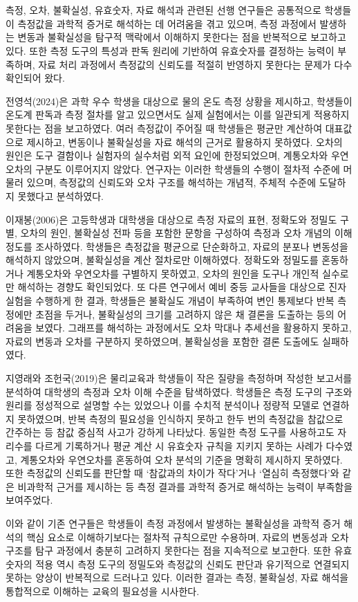 \section{}
\ganadareset

측정, 오차, 불확실성, 유효숫자, 자료 해석과 관련된 선행 연구들은
공통적으로 학생들이 측정값을 과학적 증거로 해석하는 데 어려움을 겪고 있으며,
측정 과정에서 발생하는 변동과 불확실성을
탐구적 맥락에서 이해하지 못한다는 점을 반복적으로 보고하고 있다.
%
또한 측정 도구의 특성과 판독 원리에 기반하여 유효숫자를 결정하는 능력이 부족하며,
자료 처리 과정에서 측정값의 신뢰도를 적절히 반영하지 못한다는 문제가 다수 확인되어 왔다.

전영석(2024)은 과학 우수 학생을 대상으로 물의 온도 측정 상황을 제시하고,
학생들이 온도계 판독과 측정 절차를 알고 있으면서도 실제 실험에서는
이를 일관되게 적용하지 못한다는 점을 보고하였다.
%
여러 측정값이 주어질 때 학생들은 평균만 계산하여 대표값으로 제시하고,
변동이나 불확실성을 자료 해석의 근거로 활용하지 못하였다.
오차의 원인은 도구 결함이나 실험자의 실수처럼 외적 요인에 한정되었으며,
계통오차와 우연오차의 구분도 이루어지지 않았다.
%
연구자는 이러한 학생들의 수행이 절차적 수준에 머물러 있으며,
측정값의 신뢰도와 오차 구조를 해석하는 개념적, 주체적 수준에 도달하지 못했다고 분석하였다.

이재봉(2006)은 고등학생과 대학생을 대상으로 측정 자료의 표현, 정확도와 정밀도 구별,
오차의 원인, 불확실성 전파 등을 포함한 문항을 구성하여 측정과 오차 개념의 이해 정도를 조사하였다.
학생들은 측정값을 평균으로 단순화하고, 자료의 분포나 변동성을 해석하지 않았으며,
불확실성을 계산 절차로만 이해하였다.
정확도와 정밀도를 혼동하거나 계통오차와 우연오차를 구별하지 못하였고,
오차의 원인을 도구나 개인적 실수로만 해석하는 경향도 확인되었다.
%
또 다른 연구에서 예비 중등 교사들을 대상으로 진자 실험을 수행하게 한 결과,
학생들은 불확실도 개념이 부족하여 변인 통제보다 반복 측정에만 초점을 두거나,
불확실성의 크기를 고려하지 않은 채 결론을 도출하는 등의 어려움을 보였다.
그래프를 해석하는 과정에서도 오차 막대나 추세선을 활용하지 못하고,
자료의 변동과 오차를 구분하지 못하였으며, 불확실성을 포함한 결론 도출에도 실패하였다.

지영래와 조헌국(2019)은 물리교육과 학생들이 작은 질량을 측정하며 작성한 보고서를 분석하여
대학생의 측정과 오차 이해 수준을 탐색하였다.
학생들은 측정 도구의 구조와 원리를 정성적으로 설명할 수는 있었으나
이를 수치적 분석이나 정량적 모델로 연결하지 못하였으며,
반복 측정의 필요성을 인식하지 못하고 한두 번의 측정값을 참값으로 간주하는 등
참값 중심적 사고가 강하게 나타났다.
동일한 측정 도구를 사용하고도 자리수를 다르게 기록하거나 평균 계산 시 유효숫자 규칙을
지키지 못하는 사례가 다수였고, 계통오차와 우연오차를 혼동하여 오차 분석의 기준을
명확히 제시하지 못하였다.
또한 측정값의 신뢰도를 판단할 때 `참값과의 차이가 작다'거나 `열심히 측정했다'와 같은 비과학적 근거를
제시하는 등 측정 결과를 과학적 증거로 해석하는 능력이 부족함을 보여주었다.

이와 같이 기존 연구들은 학생들이 측정 과정에서 발생하는 불확실성을 과학적 증거 해석의
핵심 요소로 이해하기보다는 절차적 규칙으로만 수용하며,
자료의 변동성과 오차 구조를 탐구 과정에서 충분히 고려하지 못한다는 점을 지속적으로 보고한다.
%
또한 유효숫자의 적용 역시 측정 도구의 정밀도와 측정값의 신뢰도 판단과 유기적으로
연결되지 못하는 양상이 반복적으로 드러나고 있다.
이러한 결과는 측정, 불확실성, 자료 해석을 통합적으로 이해하는 교육의 필요성을 시사한다.